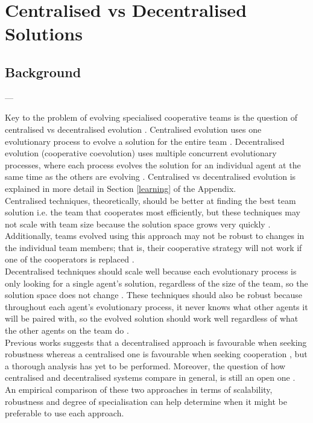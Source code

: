 \documentclass[12pt]{article}
\begin{document}
\section{Centralised vs Decentralised Solutions}

\subsection{Background}

---

Key to the problem of evolving specialised cooperative teams is the question of centralised vs decentralised evolution \cite{panait:AAMAS:2005}.
Centralised evolution uses one evolutionary process to evolve a solution for the entire team \cite{panait:AAMAS:2005}.
Decentralised evolution (cooperative coevolution) uses multiple concurrent evolutionary processes, where each process evolves the solution for an individual agent at the same time as the others are evolving \cite{panait:AAMAS:2005}.
Centralised vs decentralised evolution is explained in more detail in Section \ref{learning} of the Appendix.\\

Centralised techniques, theoretically, should be better at finding the best team solution i.e. the team that cooperates most efficiently, but these techniques may not scale with team size because the solution space grows very quickly \cite{panait:AAMAS:2005}.
Additionally, teams evolved using this approach may not be robust to changes in the individual team members; that is, their cooperative strategy will not work if one of the cooperators is replaced \cite{panait:AAMAS:2005}.\\

Decentralised techniques should scale well because each evolutionary process is only looking for a single agent's solution, regardless of the size of the team, so the solution space does not change \cite{panait:AAMAS:2005}.
These techniques should also be robust because throughout each agent's evolutionary process, it never knows what other agents it will be paired with, so the evolved solution should work well regardless of what the other agents on the team do \cite{panait:AAMAS:2005}.\\

Previous works suggests that a decentralised approach is favourable when seeking robustness whereas a centralised one is favourable when seeking cooperation \cite{wiegand:GECCO:2006}, but a thorough analysis has yet to be performed. 
Moreover, the question of how centralised and decentralised systems compare in general, is still an open one \cite{vanLon:AAMAS:2017}.
An empirical comparison of these two approaches in terms of scalability, robustness and degree of specialisation can help determine when it might be preferable to use each approach.
\end{document}
